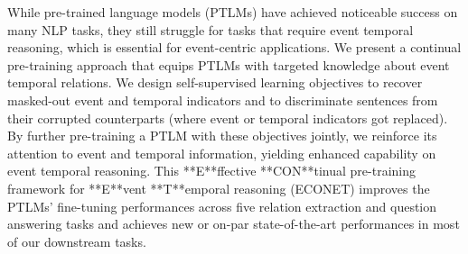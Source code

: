 While pre-trained language models (PTLMs) have achieved noticeable success on many NLP tasks, they still struggle for tasks that require event temporal reasoning, which is essential for event-centric applications. We present a continual pre-training approach that equips PTLMs with targeted knowledge about event temporal relations. We design self-supervised learning objectives to recover masked-out event and temporal indicators and to discriminate sentences from their corrupted counterparts (where event or temporal indicators got replaced). By further pre-training a PTLM with these objectives jointly, we reinforce its attention to event and temporal information, yielding enhanced capability on event temporal reasoning. This **E**ffective **CON**tinual pre-training framework for **E**vent **T**emporal reasoning (ECONET) improves the PTLMs' fine-tuning performances across five relation extraction and question answering tasks and achieves new or on-par state-of-the-art performances in most of our downstream tasks.
